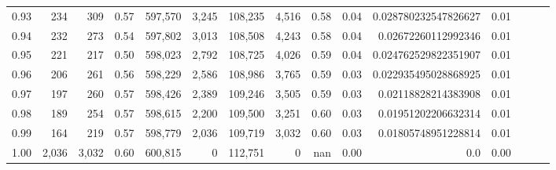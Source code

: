 \begin{tabular}{rrrrrrrrrrrrrrr}
0.93 &     234 &    309 &  0.57 &  597,570 &    3,245 &  108,235 &    4,516 &  0.58 &  0.04 &  0.028780232547826627 &      0.01 \\
0.94 &     232 &    273 &  0.54 &  597,802 &    3,013 &  108,508 &    4,243 &  0.58 &  0.04 &   0.02672260112992346 &      0.01 \\
0.95 &     221 &    217 &  0.50 &  598,023 &    2,792 &  108,725 &    4,026 &  0.59 &  0.04 &  0.024762529822351907 &      0.01 \\
0.96 &     206 &    261 &  0.56 &  598,229 &    2,586 &  108,986 &    3,765 &  0.59 &  0.03 &  0.022935495028868925 &      0.01 \\
0.97 &     197 &    260 &  0.57 &  598,426 &    2,389 &  109,246 &    3,505 &  0.59 &  0.03 &   0.02118828214383908 &      0.01 \\
0.98 &     189 &    254 &  0.57 &  598,615 &    2,200 &  109,500 &    3,251 &  0.60 &  0.03 &   0.01951202206632314 &      0.01 \\
0.99 &     164 &    219 &  0.57 &  598,779 &    2,036 &  109,719 &    3,032 &  0.60 &  0.03 &   0.01805748951228814 &      0.01 \\
1.00 &   2,036 &  3,032 &  0.60 &  600,815 &        0 &  112,751 &        0 &   nan &  0.00 &                   0.0 &      0.00 \\
\bottomrule
\end{tabular}
